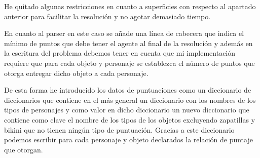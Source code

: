 \documentclass[12pt,a4paper]{article}
\begin{document}

He quitado algunas restricciones en cuanto a superficies con respecto al apartado anterior para facilitar la resolución y no agotar demasiado tiempo.

En cuanto al parser en este caso se añade una línea de cabecera que indica el mínimo de puntos que debe tener el agente al final de la resolución y además en la escritura del problema debemos tener en cuenta que mi implementación requiere que para cada objeto y personaje se establezca el número de puntos que otorga entregar dicho objeto a cada personaje.

De esta forma he introducido los datos de puntuaciones como un diccionario de diccionarios que contiene en el más general un diccionario con los nombres de los tipos de personajes y como valor en dicho diccionario un nuevo diccionario que contiene como clave el nombre de los tipos de los objetos excluyendo zapatillas y bikini que no tienen ningún tipo de puntuación. Gracias a este diccionario podemos escribir para cada personaje y objeto declarados la relación de puntaje que otorgan.
\end{document}
